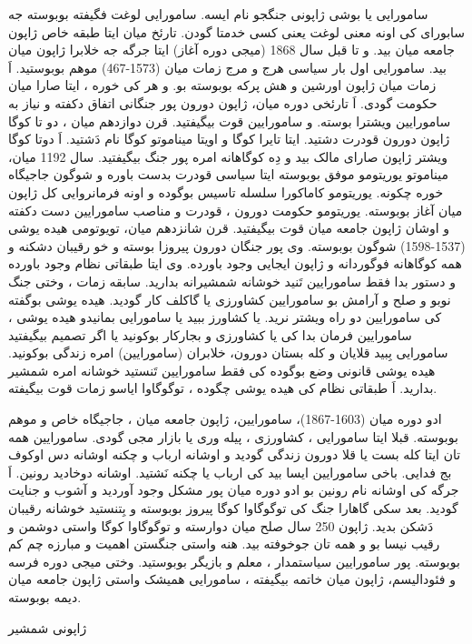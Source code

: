 \documentclass[a4paper]{article}
\begin{document}
\begin{flushright}
سامورایی یا بوشی ژاپونی جنگجو نام ایسه. سامورایی لوغت فگیفته بوبوسته جه سابورای کی اونه معنی لوغت یعنی کسی خدمتا گودن. تارئخ میان ایتا طبقه خاص ژاپون جامعه میان بید. و تا قبل سال 1868 (میجی دوره آغاز) ایتا جرگه جه خلابرا ژاپون میان بید. سامورایی اول بار سیاسی هرج و مرج زمات میان (1573-467) موهم بوبوستید. اَ زمات میان ژاپون اورشین و هش پرکه بوبوسته بو. و هر کی خوره ، ایتا صارا میان حکومت گودی. اَ تارئخی دوره میان، ژاپون دورون پور جنگانی اتفاق دکفته و نیاز به سامورایین ویشترا بوسته. و سامورایین قوت بیگیفتید. قرن دوازدهم میان ، دو تا کوگا ژاپون دورون قودرت دشتید. ایتا تایرا کوگا و اویتا میناموتو کوگا نام دَشتید. اَ دوتا کوگا ویشتر ژاپون صارای مالک بید و دِه کوگاهانه امره پور جنگ بیگیفتید. سال 1192 میان، میناموتو یوریتومو موفق بوبوسته ایتا سیاسی قودرت بدست باوره و شوگون جاجیگاه خوره چکونه. یوریتومو کاماکورا سلسله تاسیس بوگوده و اونه فرمانروایی کل ژاپون میان آغاز بوبوسته. یوریتومو حکومت دورون ، قودرت و مناصب سامورایین دست دکفته و اوشان ژاپون جامعه میان قوت بیگیفتید. قرن شانزدهم میان، تویوتومی هیده یوشی (1537-1598) شوگون بوبوسته. وی پور جنگان دورون پیروزا بوسته و خو رقیبان دشکنه و همه کوگاهانه فوگوردانه و ژاپون ایجایی وجود باورده. وی ایتا طبقاتی نظام وجود باورده و دستور بدا فقط سامورایین تَنید خوشانه شمشیرانه بدارید. سابقه زمات ، وختی جنگ نوبو و صلح و آرامش بو سامورایین کشاورزی یا گاکلف کار گودید. هیده یوشی بوگفته کی سامورایین دو راه ویشتر نرید. یا کشاورز ببید یا سامورایی بمانیدو هیده یوشی ، سامورایین فرمان بدا کی یا کشاورزی و بجارکار بوکونید یا اگر تصمیم بیگیفتید سامورایی بِبید قلایان و کله بستان دورون، خلابران (سامورایین) امره زندگی بوکونید. هیده یوشی قانونی وضع بوگوده کی فقط سامورایین تَنستید خوشانه امره شمشیر بدارید. اَ طبقاتی نظام کی هیده یوشی چگوده ، توگوگاوا ایاسو زمات قوت بیگیفته.

ادو دوره میان (1603-1867)، سامورایین، ژاپون جامعه میان ، جاجیگاه خاص و موهم بوبوسته. قبلا ایتا سامورایی ، کشاورزی ، پیله وری یا بازار مجی گودی. سامورایین همه تان ایتا کله بست یا قلا دورون زندگی گودید و اوشانه ارباب و چکنه اوشانه دس اوکوف بج فدایی. باخی سامورایین ایسا بید کی ارباب یا چکنه نَشتید. اوشانه دوخادید رونین. اَ جرگه کی اوشانه نام رونین بو ادو دوره میان پور مشکل وجود آوردید و آشوب و جنایت گودید. بعد سکی گاهارا جنگ کی توگوگاوا کوگا پیروز بوبوسته و بِتنستید خوشانه رقیبان دَشکن بدید. ژاپون 250 سال صلح میان دوارسته و توگوگاوا کوگا واستی دوشمن و رقیب نیسا بو و همه تان جوخوفته بید. هنه واستی جنگستن اهمیت و مبارزه چم کم بوبوسته. پور سامورایین سیاستمدار ، معلم و بازیگر بوبوستید. وختی میجی دوره فرسه و فئودالیسم، ژاپون میان خاتمه بیگیفته ، سامورایی همیشک واستی ژاپون جامعه میان دیمه بوبوسته.

ژاپونی شمشیر


\end{flushright}
\end{document}
